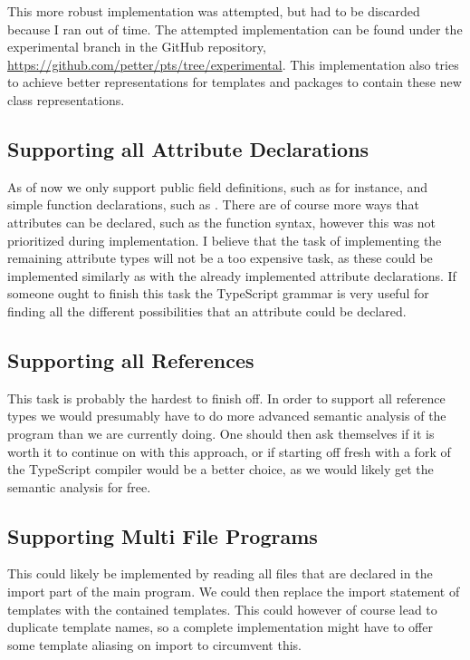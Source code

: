 This more robust implementation was attempted, but had to be discarded because I ran out of time.
The attempted implementation can be found under the experimental branch in the GitHub repository, \url{https://github.com/petter/pts/tree/experimental}.
This implementation also tries to achieve better representations for templates and packages to contain these new class representations.

\subsection{Supporting all Attribute Declarations}\label{subsec:supporting-all-attribute-declarations}

As of now we only support public field definitions, such as  for instance, and simple function declarations, such as .
There are of course more ways that attributes can be declared, such as the function syntax, however this was not prioritized during implementation.
I believe that the task of implementing the remaining attribute types will not be a too expensive task, as these could be implemented similarly as with the already implemented attribute declarations.
If someone ought to finish this task the TypeScript grammar is very useful for finding all the different possibilities that an attribute could be declared.

\subsection{Supporting all References}\label{subsec:supporting-all-references}

This task is probably the hardest to finish off.
In order to support all reference types we would presumably have to do more advanced semantic analysis of the program than we are currently doing.
One should then ask themselves if it is worth it to continue on with this approach, or if starting off fresh with a fork of the TypeScript compiler would be a better choice, as we would likely get the semantic analysis for free.

\subsection{Supporting Multi File Programs}\label{subsec:supporting-multi-file-programs}

This could likely be implemented by reading all files that are declared in the import part of the main program.
We could then replace the import statement of templates with the contained templates.
This could however of course lead to duplicate template names, so a complete implementation might have to offer some template aliasing on import to circumvent this.